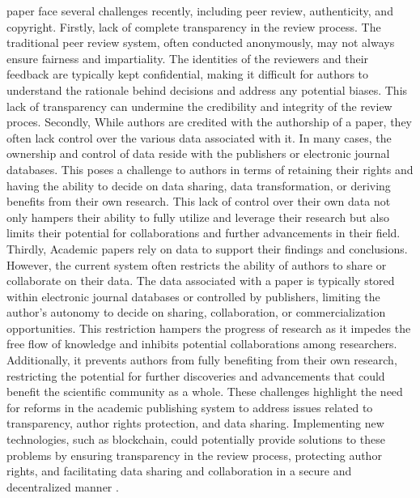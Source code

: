\documentclass[lettersize,journal]{IEEEtran}
\begin{document}
 paper face several challenges recently, including peer review, authenticity, and copyright. 
Firstly, lack of complete transparency in the review process. The traditional peer review system, often conducted anonymously, may not always ensure fairness and impartiality. The identities of the reviewers and their feedback are typically kept confidential, making it difficult for authors to understand the rationale behind decisions and address any potential biases. This lack of transparency can undermine the credibility and integrity of the review proces. 
Secondly, While authors are credited with the authorship of a paper, they often lack control over the various data associated with it. In many cases, the ownership and control of data reside with the publishers or electronic journal databases. This poses a challenge to authors in terms of retaining their rights and having the ability to decide on data sharing, data transformation, or deriving benefits from their own research. This lack of control over their own data not only hampers their ability to fully utilize and leverage their research but also limits their potential for collaborations and further advancements in their field. 
Thirdly, Academic papers rely on data to support their findings and conclusions. However, the current system often restricts the ability of authors to share or collaborate on their data. The data associated with a paper is typically stored within electronic journal databases or controlled by publishers, limiting the author's autonomy to decide on sharing, collaboration, or commercialization opportunities. This restriction hampers the progress of research as it impedes the free flow of knowledge and inhibits potential collaborations among researchers. Additionally, it prevents authors from fully benefiting from their own research, restricting the potential for further discoveries and advancements that could benefit the scientific community as a whole. 
These challenges highlight the need for reforms in the academic publishing system to address issues related to transparency, author rights protection, and data sharing. Implementing new technologies, such as blockchain\cite{swan2015blockchain}, could potentially provide solutions to these problems by ensuring transparency in the review process, protecting author rights, and facilitating data sharing and collaboration in a secure and decentralized manner \cite{mougayar2016business}.
\end{document}
